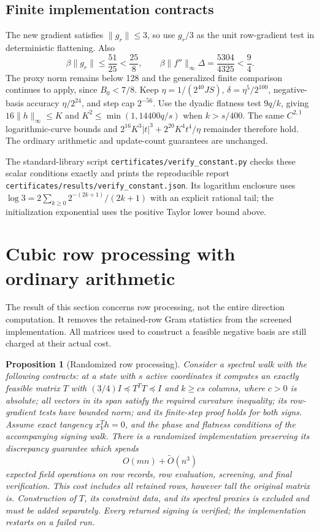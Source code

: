 \documentclass[11pt]{amsart}
\newtheorem{proposition}[theorem]{Proposition}
\theoremstyle{remark}\newtheorem{remark}[theorem]{Remark}
\begin{document}
\subsection{Finite implementation contracts}
The new gradient satisfies $\|g_r\|\le3$, so use $g_r/3$ as the unit
row-gradient test in deterministic flattening.  Also
\[
 \beta\|g_r\|\le\frac{51}{25}<\frac{25}{8},\qquad
 \beta\|f''\|_\infty\Delta
 =\frac{5304}{4325}<\frac94.
\]
The proxy norm remains below 128 and the generalized finite comparison
continues to apply, since $B_0<7/8$.  Keep
$\eta=1/(2^{40}JS)$, $\delta=\eta^5/2^{100}$, negative-basis accuracy
$\eta/2^{24}$, and step cap $2^{-56}$.
Use the dyadic flatness test $9q/k$, giving
$16\|h\|_\infty\le K$ and
$K^2\le\min(1,14400q/s)$ when $k>s/400$.
The same $C^{2,1}$ logarithmic-curve bounds and
$2^{16}K^3|t|^3+2^{20}K^4t^4/\eta$ remainder therefore hold.
The ordinary arithmetic and update-count guarantees are unchanged.

The standard-library script \nolinkurl{certificates/verify_constant.py} checks these
scalar conditions exactly and prints the reproducible report
\nolinkurl{certificates/results/verify_constant.json}.  Its logarithm enclosure uses
$\log3=2\sum_{k\ge0}2^{-(2k+1)}/(2k+1)$ with an explicit rational tail;
the initialization exponential uses the positive Taylor lower bound above.

\section{Cubic row processing with ordinary arithmetic}
\label{sec:randomscreen}

The result of this section concerns row processing, not the entire
direction computation. It removes the retained-row Gram statistics from
the screened implementation. All matrices used to construct a feasible
negative basis are still charged at their actual cost.

\begin{proposition}[Randomized row processing]\label{prop:rowprocessing}
Consider a spectral walk with the following contracts: at a state with
$s$ active coordinates it computes an exactly feasible matrix $T$ with
$(3/4)I\preceq T^TT\preceq I$ and $k\ge c s$ columns, where $c>0$ is
absolute; all vectors in its span satisfy the required curvature
inequality; its row-gradient tests have bounded norm; and its finite-step
proof holds for both signs. Assume exact tangency $x_V^Th=0$, and the
phase and flatness conditions of the accompanying signing walk.
There is a randomized implementation preserving its discrepancy guarantee
which spends
\[
 O(mn)+\widetilde O(n^3)
\]
expected field operations on row records, row evaluation, screening,
and final verification. This cost includes all retained rows, however
tall the original matrix is. Construction of $T$, its constraint data,
and its spectral proxies is excluded and must be added separately.
Every returned signing is verified; the implementation restarts on a
failed run.
\end{proposition}
\end{document}
